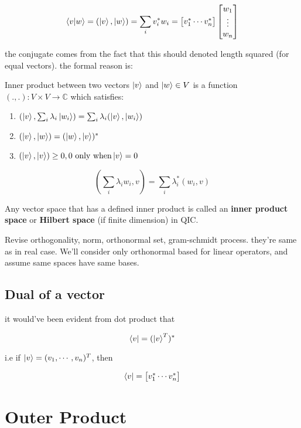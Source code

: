 $$
\braket{v|w} = (\ket{v},\ket{w}) = \sum_i v_i^*w_i = \begin{bmatrix}v_1^* \cdots v_n^*\end{bmatrix}\begin{bmatrix}w_1 \\ \vdots \\ w_n\end{bmatrix}
$$

the conjugate comes from the fact that this should denoted length squared (for equal vectors). the formal reason is:

Inner product between two vectors $\ket{v}$ and $\ket{w} \in V$ is a function $(.,.):V \times V\rightarrow \mathbb{C}$ which satisfies:

\begin{enumerate}    
\item $(\ket{v}, \sum_i \lambda_i\ket{w_i}) = \sum_i\lambda_i(\ket{v}, \ket{w_i})$
\item $( \ket{v}, \ket{w} ) = (\ket{w}, \ket{v})^*$
\item $(\ket{v}, \ket{v}) \geq 0, \text{0 only when} \ket{v} = 0$
\end{enumerate}

\begin{equation}
( \sum_i\lambda_iw_i , v) = \sum_i\lambda_i^*(w_i,v)
\end{equation}

Any vector space that has a defined inner product is called an \textbf{inner product space} or \textbf{Hilbert space} (if finite dimension) in QIC.

Revise orthogonality, norm, orthonormal set, gram-schmidt process. they're same as in real case.
We'll consider only orthonormal based for linear operators, and assume same spaces have same bases.

\subsection{Dual of a vector}

it would've been evident from dot product that

$$
\bra{v} = (\ket{v}^T)^*
$$

i.e if $\ket{v} = (v_1,\cdots, v_n)^T$, then

$$
\bra{v} = \begin{bmatrix}v_1^* \cdots v_n^*\end{bmatrix}
$$

\section{Outer Product}

